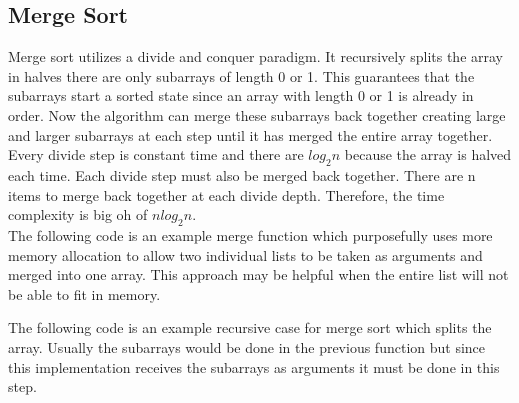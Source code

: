 \documentclass[letterpaper, 10pt]{article}
\begin{document}
\subsection{Merge Sort}
Merge sort utilizes a divide and conquer paradigm. It recursively splits the array in halves
there are only subarrays of length 0 or 1. This guarantees that the subarrays start a sorted
state since an array with length 0 or 1 is already in order. Now the algorithm can merge these
subarrays back together creating large and larger subarrays at each step until it has
merged the entire array together. Every divide step is constant time and there are \(log_2n \) because
the array is halved each time. Each divide step must also be merged back together. There are n items to
merge back together at each divide depth. Therefore, the time complexity is big oh of \(nlog_2n\). \\
\newline
The following code is an example merge function which purposefully uses more memory allocation
to allow two individual lists to be taken as arguments and merged into one array. This
approach may be helpful when the entire list will not be able to fit in memory.

The following code is an example recursive case for merge sort which splits the array.
Usually the subarrays would be done in the previous function but since this implementation
receives the subarrays as arguments it must be done in this step.

\end{document}

